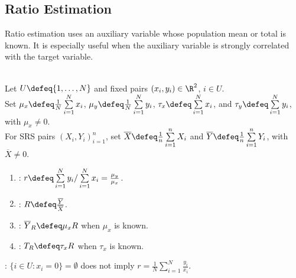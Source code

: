 \subsection{Ratio Estimation}

Ratio estimation uses an auxiliary variable whose population mean or total is known.  It is especially useful when the auxiliary variable is strongly correlated with the target variable.

\begin{definition} \label{def:finite-population-ratio} \\
Let $U\defeq\{1,\ldots,N\}$ and fixed pairs $(x_i,y_i)\in\R^2$, $i\in U$.\\
Set $\mu_x\defeq \frac{1}{N}\sum\limits_{i=1}^{N}x_i$, $\mu_y\defeq \frac{1}{N}\sum\limits_{i=1}^{N}y_i$, $\tau_x\defeq\sum\limits_{i=1}^{N}x_i$, and $\tau_y\defeq\sum\limits_{i=1}^{N}y_i$, with $\mu_x\neq0$.\\
For SRS pairs $(X_i,Y_i)_{i=1}^{n}$, set $\overline{X}\defeq \frac{1}{n}\sum\limits_{i=1}^{n}X_i$ and $\overline{Y}\defeq \frac{1}{n}\sum\limits_{i=1}^{n}Y_i$, with $\overline{X}\neq0$.
\begin{enumerate}[label=(\roman*)]
\setlength{\itemsep}{0pt}
\item {}: $r\defeq \sum\limits_{i=1}^{N}y_i/\sum\limits_{i=1}^{N}x_i =\frac{\mu_y}{\mu_x}$.
\item {}: $R\defeq \frac{\overline{Y}}{\overline{X}}$.
\item {}: $\overline{Y}_R\defeq \mu_xR$ when $\mu_x$ is known.
\item {}: $T_R\defeq \tau_xR$ when $\tau_x$ is known.
\end{enumerate}
: $\{i\in U:x_i=0\}=\emptyset$ does not imply $r=\frac{1}{N}\sum\limits_{i=1}^{N}\frac{y_i}{x_i}$.
\end{definition}

